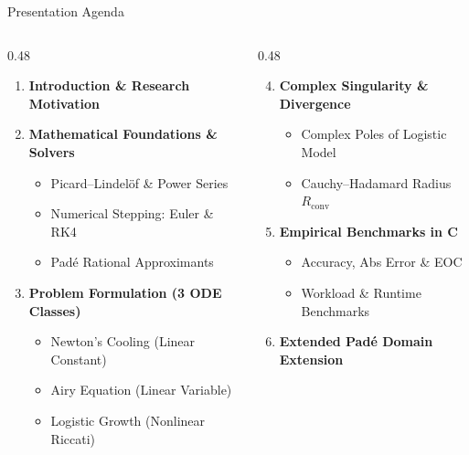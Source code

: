 \documentclass[aspectratio=169]{beamer}
\newcommand{\Rconv}{R_{\mathrm{conv}}}
\begin{document}
\begin{frame}{Presentation Agenda}
  \footnotesize
  \begin{columns}[T]
    \begin{column}{0.48\textwidth}
      \begin{enumerate}
        \item \textbf{Introduction \& Research Motivation}
        \item \textbf{Mathematical Foundations \& Solvers}
        \begin{itemize}
          \item Picard--Lindelöf \& Power Series
          \item Numerical Stepping: Euler \& RK4\footnotemark[1]
          \item Padé Rational Approximants
        \end{itemize}
        \item \textbf{Problem Formulation (3 ODE Classes)}
        \begin{itemize}
          \item Newton's Cooling (Linear Constant)
          \item Airy Equation (Linear Variable)
          \item Logistic Growth (Nonlinear Riccati)
        \end{itemize}
      \end{enumerate}
    \end{column}
    \begin{column}{0.48\textwidth}
      \begin{enumerate}
        \setcounter{enumi}{3}
        \item \textbf{Complex Singularity \& Divergence}
        \begin{itemize}
          \item Complex Poles of Logistic Model
          \item Cauchy--Hadamard Radius $\Rconv$
        \end{itemize}
        \item \textbf{Empirical Benchmarks in C}
        \begin{itemize}
          \item Accuracy, Abs Error \& EOC\footnotemark[2]
          \item Workload \& Runtime Benchmarks
        \end{itemize}
        \item \textbf{Extended Padé Domain Extension}

\end{enumerate}
\end{column}
\end{columns}
\end{frame}
\end{document}
